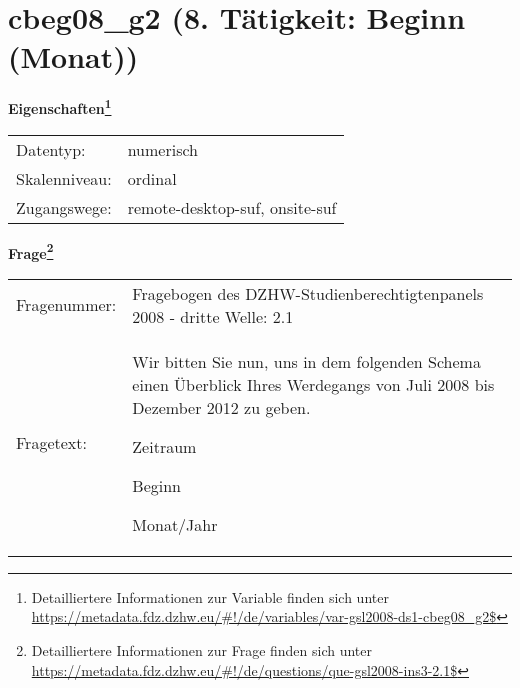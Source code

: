 
    \setcounter{footnote}{0}

    \vspace*{-1.8cm}
	\section{cbeg08\_g2 (8. Tätigkeit: Beginn (Monat))}
	\label{section:cbeg08_g2}



    \vspace*{0.5cm}
    \noindent\textbf{Eigenschaften\footnote{Detailliertere Informationen zur Variable finden sich unter
		\url{https://metadata.fdz.dzhw.eu/\#!/de/variables/var-gsl2008-ds1-cbeg08_g2$}}}\\
	\begin{tabularx}{\hsize}{@{}lX}
	Datentyp: & numerisch \\
	Skalenniveau: & ordinal \\
	Zugangswege: &
	  remote-desktop-suf, 
	  onsite-suf
 \\
    \end{tabularx}



				\vspace*{0.5cm}
                \noindent\textbf{Frage\footnote{Detailliertere Informationen zur Frage finden sich unter
		              \url{https://metadata.fdz.dzhw.eu/\#!/de/questions/que-gsl2008-ins3-2.1$}}}\\
				\begin{tabularx}{\hsize}{@{}lX}
					Fragenummer: &
					  Fragebogen des DZHW-Studienberechtigtenpanels 2008 - dritte Welle:
					  2.1
 \\
					Fragetext: & Wir bitten Sie nun, uns in dem folgenden Schema einen Überblick Ihres Werdegangs von Juli 2008 bis Dezember 2012 zu geben.\par  Zeitraum\par  Beginn\par  Monat/Jahr \\
				\end{tabularx}





